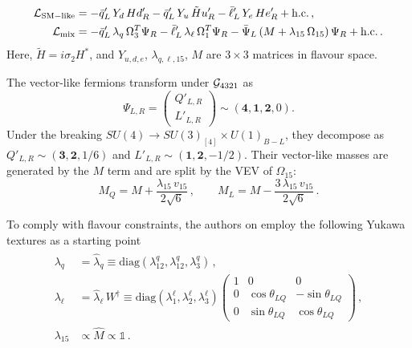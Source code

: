 \begin{align}
\label{LYUK1}
\mathcal{L}_{\rm SM-like} &=  - \bar{q}'_L \,Y_d \, H d'_R - \bar{q}'_L \,Y_u \, \tilde H u'_R - \bar{\ell}'_L \, Y_e \, H e'_R + \text{h.c.} \, ,  \\
\label{LYUK2}
\mathcal{L}_{\rm mix} &= - \bar {q}'_L \, \lambda_q \, \Omega_3^T \Psi_R - \bar {\ell}'_L \, \lambda_\ell \, \Omega_1^T \Psi_R 
- \bar \Psi_L \left( M + \lambda_{15}\, \Omega_{15} \right) \Psi_R + \text{h.c.} \, .
\end{align}
Here, $\tilde H = i \sigma_2 H^*$, and $Y_{u,d,e}$, $\lambda_{q,\ell,15}$, $M$ are $3 \times 3$ matrices in flavour space.


The vector-like fermions transform under $\mathcal{G}_{\rm 4321}$ as
\begin{equation}
  \Psi_{L,R} = \begin{pmatrix}
    Q'_{L,R} \\
    L'_{L,R}
  \end{pmatrix} \sim (\mathbf{4},\mathbf{1},\mathbf{2},0).
\end{equation}
Under the breaking $SU(4)\to SU(3)_{[4]}\times U(1)_{B-L}$, they decompose as $Q'_{L,R} \sim (\mathbf{3}, \mathbf{2},1/6)$ and $L'_{L,R}\sim(\mathbf{1}, \mathbf{2},-1/2)$. Their vector-like masses are generated by the $M$ term and are split by the VEV of $\Omega_{15}$:
\begin{equation}
  M_Q = M + \frac{\lambda_{15}\, v_{15}}{2\sqrt{6}}\,,  \qquad M_L = M - \frac{3\,\lambda_{15}\,v_{15}}{2\sqrt{6}}\,.
\end{equation}



To comply with flavour constraints, the authors on \cite{DiLuzio2018} employ the following Yukawa textures as a starting point
\begin{align}\label{lamqfs}
\begin{aligned}
\lambda_q &= \hat{\lambda}_q \equiv \text{diag} \left( \lambda^q_{12}, \lambda^q_{12}, \lambda^q_{3} \right)
\, , \\
\lambda_{\ell} &= \hat{\lambda}_{\ell}\,  W^\dagger \equiv
\text{diag} \left( \lambda^{\ell}_{1}, \lambda^{\ell}_{2}, \lambda^{\ell}_{3} \right)
\left(
\begin{array}{ccc}
1 & 0 & 0 \\
0 & \cos \theta_{LQ} & -\sin \theta_{LQ} \\
0 & \sin \theta_{LQ} & \cos \theta_{LQ}
\end{array}
\right) \, , \\ 
\lambda_{15} & \propto \hat{M} \propto \mathbb{1} \, .
\end{aligned}
\end{align}

